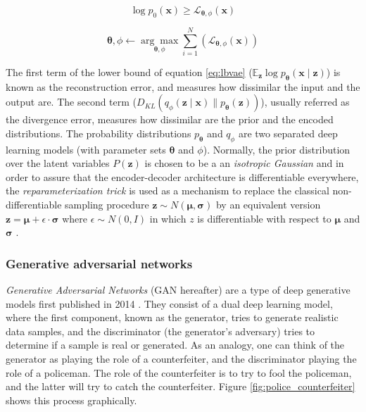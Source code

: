 \begin{equation}
\label{eq:vaelbasloss}
\log p_{0}(\mathbf{x}) \geq \mathcal{L}_{\mathbf{\theta}, \phi}\left(\mathbf{x}\right)
\end{equation}

\begin{equation}
\label{eq:vaeopt}
\mathbf{\theta}, \phi \leftarrow \underset{\mathbf{\theta}, \phi}{\arg \max } \sum_{i=1}^{N}\left(\mathcal{L}_{\mathbf{\theta}, \phi}(\mathbf{x})\right)
\end{equation}

The first term of the lower bound of equation \ref{eq:lbvae} ($\mathbb{E}_{\mathbf{z}} \log p_{\mathbf{\theta}}(\mathbf{x} \mid \mathbf{z})$) is known as the reconstruction error, and measures how dissimilar the input and the output are. The second term ($D_{K L}\left(q_{\phi}(\mathbf{z} \mid \mathbf{x}) \| p_{\mathbf{\theta}}(\mathbf{z})\right)$), usually referred as the divergence error, measures how dissimilar are the prior and the encoded distributions. The probability distributions $p_\mathbf{\theta}$ and $q_\phi$ are two separated deep learning models (with parameter sets $\mathbf{\theta}$ and $\phi$). Normally, the prior distribution over the latent variables $P(\mathbf{z})$ is chosen to be a an \textit{isotropic Gaussian} \autocite{wei2021} and in order to assure that the encoder-decoder architecture is differentiable everywhere, the \textit{reparameterization trick} is used as a mechanism to replace the classical non-differentiable sampling procedure $\mathbf{z} \sim N(\mathbf{\mu}, \mathbf{\sigma})$ by an equivalent version $\mathbf{z} = \mathbf{\mu} + \epsilon \cdot \mathbf{\sigma}$ where $\epsilon \sim N(0,I)$ in which $z$ is differentiable with respect to $\mathbf{\mu}$ and $\mathbf{\sigma}$ \autocite{kingma2019}.


\subsubsection{Generative adversarial networks}
\textit{Generative Adversarial Networks} (GAN hereafter) are a type of deep generative models first published in 2014 \autocite{Goodfellow2014}. They consist of a dual deep learning model, where the first component, known as the generator, tries to generate realistic data samples, and the discriminator (the generator's adversary) tries to determine if a sample is real or generated. As an analogy, one can think of the generator as playing the role of a counterfeiter, and the discriminator playing the role of a policeman. The role of the counterfeiter is to try to fool the policeman, and the latter will try to catch the counterfeiter. Figure \ref{fig:police_counterfeiter} shows this process graphically.

